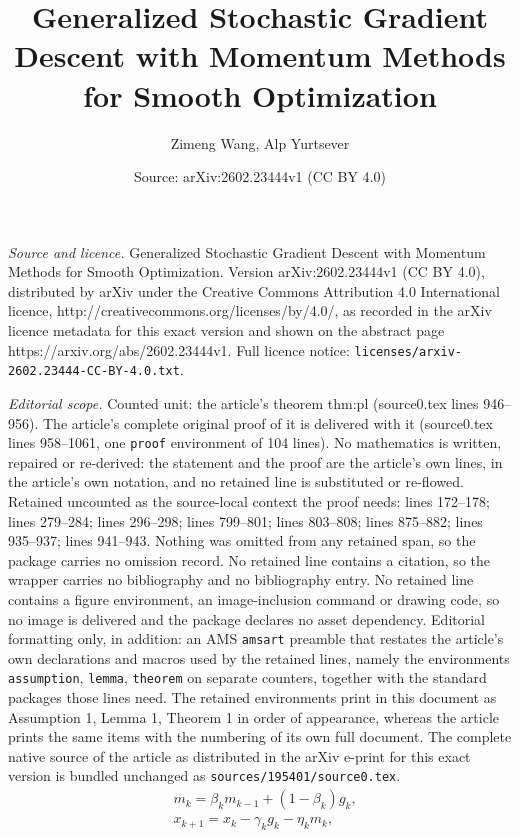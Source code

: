 \documentclass[10pt,a4paper]{amsart}
\title{Generalized Stochastic Gradient Descent with Momentum Methods for Smooth Optimization}
\author{Zimeng Wang, Alp Yurtsever}
\date{Source: arXiv:2602.23444v1 (CC BY 4.0)}
\begin{document}
\maketitle

\noindent\emph{Source and licence.} Generalized Stochastic Gradient Descent with Momentum Methods for Smooth Optimization. Version arXiv:2602.23444v1 (CC BY 4.0), distributed by arXiv under the Creative Commons Attribution 4.0 International licence, http://creativecommons.org/licenses/by/4.0/, as recorded in the arXiv licence metadata for this exact version and shown on the abstract page https://arxiv.org/abs/2602.23444v1. Full licence notice: \texttt{licenses/arxiv-2602.23444-CC-BY-4.0.txt}.\par\smallskip

\noindent\textit{Editorial scope.} Counted unit: the article's theorem thm:pl (source0.tex lines 946--956). The article's complete original proof of it is delivered with it (source0.tex lines 958--1061, one \texttt{proof} environment of 104 lines). No mathematics is written, repaired or re-derived: the statement and the proof are the article's own lines, in the article's own notation, and no retained line is substituted or re-flowed.  Retained uncounted as the source-local context the proof needs: lines 172--178; lines 279--284; lines 296--298; lines 799--801; lines 803--808; lines 875--882; lines 935--937; lines 941--943.  Nothing was omitted from any retained span, so the package carries no omission record.  No retained line contains a citation, so the wrapper carries no bibliography and no bibliography entry.  No retained line contains a figure environment, an image-inclusion command or drawing code, so no image is delivered and the package declares no asset dependency.  Editorial formatting only, in addition: an AMS \texttt{amsart} preamble that restates the article's own declarations and macros used by the retained lines, namely the environments \texttt{assumption}, \texttt{lemma}, \texttt{theorem} on separate counters, together with the standard packages those lines need.  The retained environments print in this document as Assumption 1, Lemma 1, Theorem 1 in order of appearance, whereas the article prints the same items with the numbering of its own full document.  The complete native source of the article as distributed in the arXiv e-print for this exact version is bundled unchanged as \texttt{sources/195401/source0.tex}.
\begin{equation}\label{alg:g-sgdm}
\tag{G-SGDM}
    \begin{aligned}
        &m_k=\beta_k m_{k-1}+(1-\beta_k)g_k, \\
        &x_{k+1}=x_k-\gamma_k g_k-\eta_k m_k,
    \end{aligned}
\end{equation}
\end{document}
